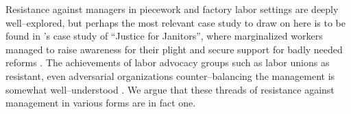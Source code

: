 \documentclass[trackingWork]{subfiles}
\begin{document}
{Resistance against managers in piecework and factory labor settings are deeply well--explored,
but perhaps the most relevant case study to draw on here is to be found in
\citeauthor{waldinger1996helots}'s case study of ``Justice for Janitors'',
where marginalized workers managed to raise awareness for their plight and secure support for badly needed reforms
\cite{waldinger1996helots}.
The achievements of labor advocacy groups such as labor unions as resistant,
even adversarial organizations counter--balancing the management
is somewhat well--understood
\cite{russell1982collective,craig1992behavior}.
We argue that these threads of resistance against management in various forms
are in fact one.
}
\end{document}
